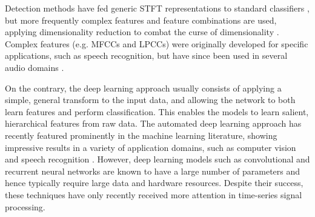 \documentclass[10pt, twocolumn]{llncs}
\begin{document}
Detection methods have fed generic STFT representations to standard classifiers \cite{potamitis2014classifying}, but more frequently complex features and feature combinations are used, applying dimensionality reduction to combat the curse of dimensionality \cite{lee2009unsupervised}. Complex features (e.g. MFCCs and LPCCs) were originally developed for specific applications, such as speech recognition, but have since been used in several audio domains \cite{li2001classification}.


On the contrary, the deep learning approach usually consists of applying a simple, general transform to the input data, and allowing the network to both learn features and perform classification. This enables the models to learn salient, hierarchical features from raw data. The automated deep learning approach has recently featured prominently in the machine learning literature, showing impressive results in a variety of application domains, such as computer vision \cite{krizhevsky2012imagenet} and speech recognition \cite{lee2009unsupervised}. However, deep learning models such as convolutional and recurrent neural networks are known to have a large number of parameters and hence typically require large data and hardware resources. 
Despite their success, these techniques have only recently received more attention in time-series signal processing.



\end{document}
